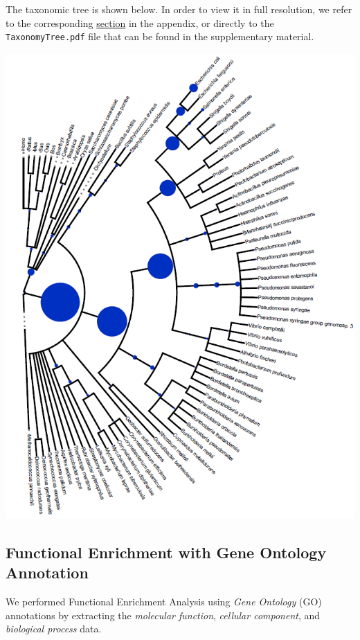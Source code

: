 \documentclass[10pt,twocolumn,letterpaper]{article}
\begin{document}
The taxonomic tree is shown below. In order to view it in full resolution, we refer to the corresponding \hyperref[sec:taxtree]{section} in the appendix, or directly to the \texttt{TaxonomyTree.pdf} file that can be found in the supplementary material.

\begin{center}
    \includegraphics[scale=0.45]{report/img/taxonomy_tree.png}
\end{center}

\subsection{Functional Enrichment with Gene Ontology Annotation}

We performed Functional Enrichment Analysis using \textit{Gene Ontology} (GO) annotations by extracting the \textit{molecular function}, \textit{cellular component}, and \textit{biological process} data.
\end{document}
